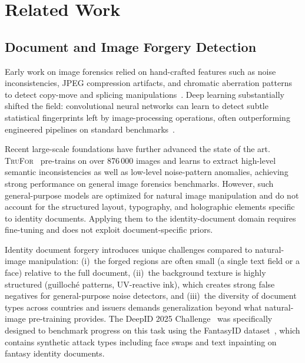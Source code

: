 
\section{Related Work}
\label{sec:related}

\subsection{Document and Image Forgery Detection}

Early work on image forensics relied on hand-crafted features such as noise
inconsistencies, JPEG compression artifacts, and chromatic aberration patterns to
detect copy-move and splicing manipulations~\cite{huh2018fighting}. Deep learning
substantially shifted the field: convolutional neural networks can learn to detect
subtle statistical fingerprints left by image-processing operations, often
outperforming engineered pipelines on standard benchmarks~\cite{bappy2019hybrid,
mantranet2019}.

Recent large-scale foundations have further advanced the state of the art.
\textsc{TruFor}~\cite{trufor2023} pre-trains on over 876\,000 images and learns to
extract high-level semantic inconsistencies as well as low-level noise-pattern
anomalies, achieving strong performance on general image forensics benchmarks.
However, such general-purpose models are optimized for natural image manipulation
and do not account for the structured layout, typography, and holographic elements
specific to identity documents. Applying them to the identity-document domain
requires fine-tuning and does not exploit document-specific priors.

Identity document forgery introduces unique challenges compared to natural-image
manipulation: (i)~the forged regions are often small (a single text field or a
face) relative to the full document, (ii)~the background texture is highly
structured (guilloch\'e patterns, UV-reactive ink), which creates strong false
negatives for general-purpose noise detectors, and (iii)~the diversity of
document types across countries and issuers demands generalization beyond what
natural-image pre-training provides. The DeepID 2025 Challenge~\cite{deepid2025challenge}
was specifically designed to benchmark progress on this task using the
FantasyID dataset~\cite{fantasyid2024}, which contains synthetic attack types
including face swaps and text inpainting on fantasy identity documents.

